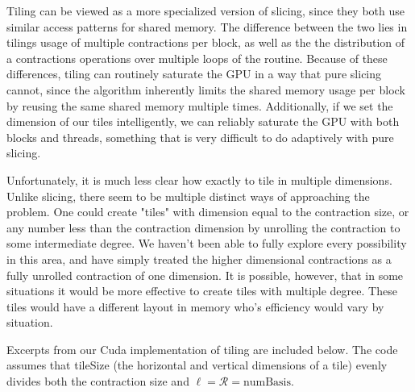 	Tiling can be viewed as a more specialized version of slicing, since they both use similar access patterns for shared memory. The difference between the two lies in tilings usage of multiple contractions per block, as well as the the distribution of a contractions operations over multiple loops of the routine. Because of these differences, tiling can routinely saturate the GPU in a way that pure slicing cannot, since the algorithm inherently limits the shared memory usage per block by reusing the same shared memory multiple times. Additionally, if we set the dimension of our tiles intelligently, we can reliably saturate the GPU with both blocks and threads, something that is very difficult to do adaptively with pure slicing. 
	
	Unfortunately, it is much less clear how exactly to tile in multiple dimensions. Unlike slicing, there seem to be multiple distinct ways of approaching the problem. One could create "tiles" with dimension equal to the contraction size, or any number less than the contraction dimension by unrolling the contraction to some intermediate degree. We haven't been able to fully explore every possibility in this area, and have simply treated the higher dimensional contractions as a fully unrolled contraction of one dimension. It is possible, however, that in some situations it would be more effective to create tiles with multiple degree. These tiles would have a different layout in memory who's efficiency would vary by situation. 
	
	Excerpts from our Cuda implementation of tiling are included below. The code assumes that tileSize (the horizontal and vertical dimensions of a tile) evenly divides both the contraction size and $\ell = \mathcal{R} = \text{numBasis}$.
	
